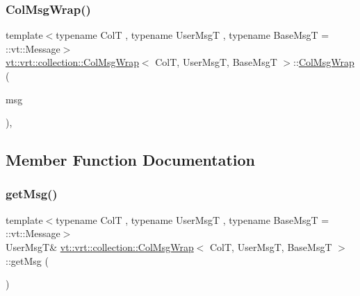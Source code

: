 \mbox{\label{structvt_1_1vrt_1_1collection_1_1_col_msg_wrap_ac19f3573a80a849d41fd5874fe94414a}} 
\subsubsection{\texorpdfstring{Col\+Msg\+Wrap()}{ColMsgWrap()}\hspace{0.1cm}{\footnotesize\ttfamily [3/3]}}
{\footnotesize\ttfamily template$<$typename ColT , typename User\+MsgT , typename Base\+MsgT  = \+::vt\+::\+Message$>$ \\
\hyperlink{structvt_1_1vrt_1_1collection_1_1_col_msg_wrap}{vt\+::vrt\+::collection\+::\+Col\+Msg\+Wrap}$<$ ColT, User\+MsgT, Base\+MsgT $>$\+::\hyperlink{structvt_1_1vrt_1_1collection_1_1_col_msg_wrap}{Col\+Msg\+Wrap} (\begin{DoxyParamCaption}\item[{User\+MsgT const \&}]{msg }\end{DoxyParamCaption})\hspace{0.3cm}{\ttfamily [inline]}, {\ttfamily [explicit]}}



\subsection{Member Function Documentation}
\mbox{\label{structvt_1_1vrt_1_1collection_1_1_col_msg_wrap_a69d30485a72651a7ede17f6bcdb13cd4}} 
\subsubsection{\texorpdfstring{get\+Msg()}{getMsg()}}
{\footnotesize\ttfamily template$<$typename ColT , typename User\+MsgT , typename Base\+MsgT  = \+::vt\+::\+Message$>$ \\
User\+MsgT\& \hyperlink{structvt_1_1vrt_1_1collection_1_1_col_msg_wrap}{vt\+::vrt\+::collection\+::\+Col\+Msg\+Wrap}$<$ ColT, User\+MsgT, Base\+MsgT $>$\+::get\+Msg (\begin{DoxyParamCaption}{ }\end{DoxyParamCaption})\hspace{0.3cm}{\ttfamily [inline]}}

